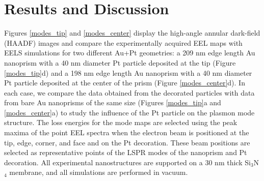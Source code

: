 \documentclass [11pt, proquest] {uwthesis}[2016/11/22]
\begin{document}
\section{Results and Discussion}
Figures \ref{modes_tip} and \ref{modes_center} display the high-angle annular dark-field (HAADF) images and compare the experimentally acquired EEL maps with EELS simulations for two different Au+Pt geometries: a 209 nm edge length Au nanoprism with a 40 nm diameter Pt particle deposited at the tip (Figure \ref{modes_tip}d) and a 198 nm edge length Au nanoprism with a 40 nm diameter Pt particle deposited at the center of the prism (Figure \ref{modes_center}d). In each case, we compare the data obtained from the decorated particles with data from bare Au nanoprisms of the same size (Figures \ref{modes_tip}a and \ref{modes_center}a) to study the influence of the Pt particle on the plasmon mode structure. The loss energies for the mode maps are selected using the peak maxima of the point EEL spectra when the electron beam is positioned at the tip, edge, corner, and face and on the Pt decoration. These beam positions are selected as representative points of the LSPR modes of the nanoprism and Pt decoration. All experimental nanostructures are supported on a 30 nm thick Si$_3$N$_4$ membrane, and all simulations are performed in vacuum.
\end{document}
